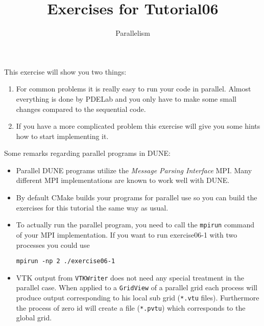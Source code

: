 \documentclass[12pt,a4paper]{article}
\title{\textbf{Exercises for Tutorial06}}
\subtitle{Parallelism}
\begin{document}
\exerciseheader

This exercise will show you two things:
\begin{enumerate}
\item For common problems it is really easy to run your code in
  parallel. Almost everything is done by PDELab and you only have to make
  some small changes compared to the sequential code.
\item If you have a more complicated problem this exercise will give
  you some hints how to start implementing it.
\end{enumerate}

Some remarks regarding parallel programs in DUNE:
\begin{itemize}
\item Parallel DUNE programs utilize the \emph{Message Parsing
    Interface} MPI. Many different MPI implementations are known to
  work well with DUNE.
\item By default CMake builds your programs for parallel use so you
  can build the exercises for this tutorial the same way as usual.
\item To actually run the parallel program, you need to call the
  \lstinline{mpirun} command of your MPI implementation. If you want
  to run exercise06-1 with two processes you could use
  \begin{lstlisting}
mpirun -np 2 ./exercise06-1
  \end{lstlisting}
\item VTK output from \lstinline{VTKWriter} does not need any special
  treatment in the parallel case. When applied to a
  \lstinline{GridView} of a parallel grid each process will produce
  output corresponding to his local sub grid (\lstinline{*.vtu}
  files).  Furthermore the process of zero id will create a file
  (\lstinline{*.pvtu}) which corresponds to the global grid.
\end{itemize}
\end{document}
